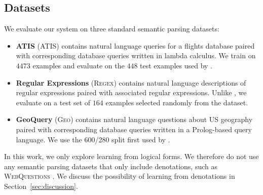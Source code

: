 \documentclass[11pt,letterpaper]{article}
\newcommand{\atis}{\textsc{ATIS}\xspace}
\newcommand{\regex}{\textsc{Regex}\xspace}
\newcommand{\geo}{\textsc{Geo}\xspace}
\begin{document}
\subsection{Datasets}

We evaluate our system on three standard semantic parsing datasets:
\begin{itemize}
  \item \textbf{ATIS} (\atis) contains 
    natural language queries for a flights database
    paired with corresponding database queries written in
    lambda calculus.
    We train on $4473$ examples and evaluate on the $448$
    test examples used by 
    .

  \item \textbf{Regular Expressions} (\regex)
  contains natural language descriptions of regular expressions
  paired with associated regular expressions.
  Unlike , 
  we evaluate
  on a test set of $164$ examples selected randomly
  from the dataset.

  \item \textbf{GeoQuery} (\geo) contains
  natural language questions about US geography
  paired with corresponding database queries written in a Prolog-based
  query language.
  We use the 600/280 split first used by
  .
\end{itemize}


In this work, we only explore learning from logical forms.
We therefore do not use any semantic parsing datasets
that only include denotations,
such as \textsc{WebQuestions} \cite{berant2013freebase}.
We discuss the possibility of learning from denotations
in Section~\ref{sec:discussion}.
\end{document}
